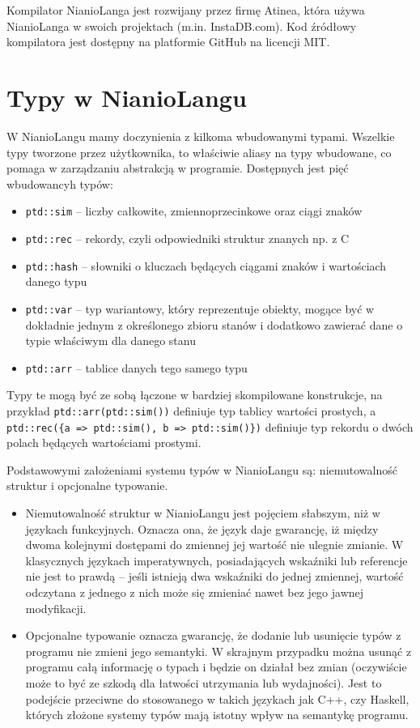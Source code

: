 \documentclass[licencjacka]{pracamgr}
\begin{document}
Kompilator NianioLanga jest rozwijany przez firmę Atinea, która używa NianioLanga w swoich projektach (m.in. InstaDB.com).
Kod źródłowy kompilatora jest dostępny na platformie GitHub\cite{github_repo_nianiolang_original} na licencji MIT.

\section{Typy w NianioLangu}
W NianioLangu mamy doczynienia z kilkoma wbudowanymi typami. Wszelkie typy tworzone przez użytkownika, to właściwie aliasy na typy wbudowane,
co pomaga w zarządzaniu abstrakcją w programie. Dostępnych jest pięć wbudowancyh typów: 
\begin{itemize}
  \item \texttt{ptd::sim} -- liczby całkowite, zmiennoprzecinkowe oraz ciągi znaków
  \item \texttt{ptd::rec} -- rekordy, czyli odpowiedniki struktur znanych np. z C
  \item \texttt{ptd::hash} -- słowniki o kluczach będących ciągami znaków i wartościach danego typu
  \item \texttt{ptd::var} -- typ wariantowy, który reprezentuje obiekty, mogące być w dokładnie jednym z określonego zbioru stanów i dodatkowo
  zawierać dane o typie właściwym dla danego stanu
  \item \texttt{ptd::arr} -- tablice danych tego samego typu
\end{itemize}

Typy te mogą być ze sobą łączone w bardziej skompilowane konstrukcje, na przykład \texttt{ptd::arr(ptd::sim())} definiuje
typ tablicy wartości prostych, a \texttt{ptd::rec(\{a => ptd::sim(), b => ptd::sim()\})} definiuje typ rekordu o dwóch polach będących wartościami
prostymi.

Podstawowymi założeniami systemu typów w NianioLangu są: niemutowalność struktur i opcjonalne typowanie.

\begin{itemize}
 \item Niemutowalność struktur w NianioLangu jest pojęciem słabszym, niż w językach funkcyjnych. Oznacza ona,
 że język daje gwarancję, iż między dwoma kolejnymi dostępami do zmiennej jej wartość nie ulegnie zmianie.
 W klasycznych językach imperatywnych, posiadających wskaźniki lub referencje nie jest to prawdą -- jeśli istnieją dwa wskaźniki
 do jednej zmiennej, wartość odczytana z jednego z nich może się zmieniać nawet bez jego jawnej modyfikacji.
 \item Opcjonalne typowanie oznacza gwarancję, że dodanie lub usunięcie typów z programu nie zmieni jego semantyki.
 W skrajnym przypadku można usunąć z programu całą informację o typach i będzie on działał bez zmian
 (oczywiście może to być ze szkodą dla łatwości utrzymania lub wydajności). Jest to podejście przeciwne do stosowanego
 w takich językach jak C++, czy Haskell, których złożone systemy typów mają istotny wpływ na semantykę programu.
\end{itemize}
\end{document}
